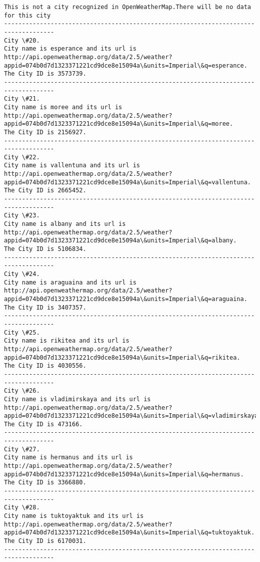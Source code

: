 \documentclass[11pt]{article}
\begin{document}
\begin{Verbatim}[commandchars=\\\{\}]
This is not a city recognized in OpenWeatherMap.There will be no data for this city
------------------------------------------------------------------------------------
City \#20.
City name is esperance and its url is http://api.openweathermap.org/data/2.5/weather?appid=074b0d7d1323371221cd9dce8e15094a\&units=Imperial\&q=esperance.
The City ID is 3573739.
------------------------------------------------------------------------------------
City \#21.
City name is moree and its url is http://api.openweathermap.org/data/2.5/weather?appid=074b0d7d1323371221cd9dce8e15094a\&units=Imperial\&q=moree.
The City ID is 2156927.
------------------------------------------------------------------------------------
City \#22.
City name is vallentuna and its url is http://api.openweathermap.org/data/2.5/weather?appid=074b0d7d1323371221cd9dce8e15094a\&units=Imperial\&q=vallentuna.
The City ID is 2665452.
------------------------------------------------------------------------------------
City \#23.
City name is albany and its url is http://api.openweathermap.org/data/2.5/weather?appid=074b0d7d1323371221cd9dce8e15094a\&units=Imperial\&q=albany.
The City ID is 5106834.
------------------------------------------------------------------------------------
City \#24.
City name is araguaina and its url is http://api.openweathermap.org/data/2.5/weather?appid=074b0d7d1323371221cd9dce8e15094a\&units=Imperial\&q=araguaina.
The City ID is 3407357.
------------------------------------------------------------------------------------
City \#25.
City name is rikitea and its url is http://api.openweathermap.org/data/2.5/weather?appid=074b0d7d1323371221cd9dce8e15094a\&units=Imperial\&q=rikitea.
The City ID is 4030556.
------------------------------------------------------------------------------------
City \#26.
City name is vladimirskaya and its url is http://api.openweathermap.org/data/2.5/weather?appid=074b0d7d1323371221cd9dce8e15094a\&units=Imperial\&q=vladimirskaya.
The City ID is 473166.
------------------------------------------------------------------------------------
City \#27.
City name is hermanus and its url is http://api.openweathermap.org/data/2.5/weather?appid=074b0d7d1323371221cd9dce8e15094a\&units=Imperial\&q=hermanus.
The City ID is 3366880.
------------------------------------------------------------------------------------
City \#28.
City name is tuktoyaktuk and its url is http://api.openweathermap.org/data/2.5/weather?appid=074b0d7d1323371221cd9dce8e15094a\&units=Imperial\&q=tuktoyaktuk.
The City ID is 6170031.
------------------------------------------------------------------------------------

\end{Verbatim}
\end{document}
